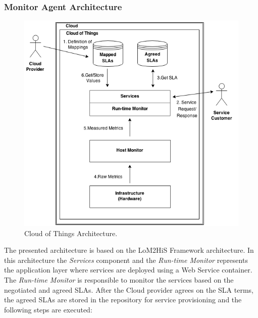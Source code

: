 \subsubsection{Monitor Agent Architecture}
\label{subs:monitoring_srchitecture}
\vspace{1in}
\begin{figure}[h!]
  \centering
  \includegraphics[width=.8\textwidth]{./images/cloud-of-things-architecture}
  \caption{Cloud of Things Architecture.}
  \label{fig:cloud_of_things_architecture}
\end{figure}
The presented architecture is based on the LoM2HiS Framework \cite{emeakaroha2010low} architecture. In this
architecture the \textit{Services} component and the \textit{Run-time Monitor} represents the application layer
where services are deployed using a Web Service container. The \textit{Run-time Monitor} is responsible to monitor
the services based on the negotiated and agreed SLAs. After the Cloud provider agrees on the SLA terms, the
agreed SLAs are stored in the repository for service provisioning and the following steps are executed:
